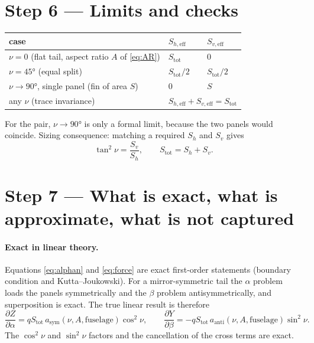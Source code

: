 \documentclass[11pt,a4paper]{article}
\begin{document}
\section{Step 6 --- Limits and checks}

\begin{center}
\begin{tabular}{@{}lll@{}}
\toprule
case & $S_{h,\mathrm{eff}}$ & $S_{v,\mathrm{eff}}$ \\
\midrule
$\nu = 0$ (flat tail, aspect ratio $A$ of \eqref{eq:AR}) & $S_\mathrm{tot}$ & $0$ \\
$\nu = \ang{45}$ (equal split) & $S_\mathrm{tot}/2$ & $S_\mathrm{tot}/2$ \\
$\nu \to \ang{90}$, single panel (fin of area $S$) & $0$ & $S$ \\
any $\nu$ (trace invariance) & \multicolumn{2}{l}{$S_{h,\mathrm{eff}}+S_{v,\mathrm{eff}}=S_\mathrm{tot}$}\\
\bottomrule
\end{tabular}
\end{center}
For the pair, $\nu\to\ang{90}$ is only a formal limit, because the two panels would coincide.
Sizing consequence: matching a required $S_h$ and $S_v$ gives
\begin{equation}
  \tan^2\nu = \frac{S_v}{S_h},\qquad S_\mathrm{tot} = S_h + S_v . \label{eq:sizing}
\end{equation}

\section{Step 7 --- What is exact, what is approximate, what is not captured}

\paragraph{Exact in linear theory.} Equations \eqref{eq:alphan} and \eqref{eq:force} are exact
first-order statements (boundary condition and Kutta--Joukowski). For a mirror-symmetric tail the
$\alpha$ problem loads the panels symmetrically and the $\beta$ problem antisymmetrically, and
superposition is exact. The true linear result is therefore
\begin{equation}
  \frac{\partial Z}{\partial\alpha} = q S_\mathrm{tot}\,a_\mathrm{sym}(\nu,A,\text{fuselage})\cos^2\nu,\qquad
  \frac{\partial Y}{\partial\beta} = -q S_\mathrm{tot}\,a_\mathrm{anti}(\nu,A,\text{fuselage})\sin^2\nu .
  \label{eq:exact}
\end{equation}
The $\cos^2\nu$ and $\sin^2\nu$ factors and the cancellation of the cross terms are exact.
\end{document}
